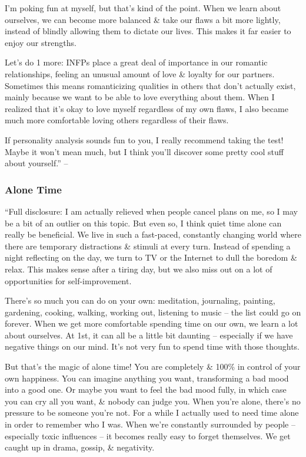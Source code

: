 \documentclass{article}
\numberwithin{equation}{section}
\begin{document}
I'm poking fun at myself, but that's kind of the point. When we learn about ourselves, we can become more balanced \& take our flaws a bit more lightly, instead of blindly allowing them to dictate our lives. This makes it far easier to enjoy our strengths.

Let's do 1 more: INFPs place a great deal of importance in our romantic relationships, feeling an unusual amount of love \& loyalty for our partners. Sometimes this means romanticizing qualities in others that don't actually exist, mainly because we want to be able to love everything about them. When I realized that it's okay to love myself regardless of my own flaws, I also became much more comfortable loving others regardless of their flaws.

If personality analysis sounds fun to you, I really recommend taking the test! Maybe it won't mean much, but I think you'll discover some pretty cool stuff about yourself.'' -- \cite[pp. 154--156]{MacKenzie2015}

\subsubsection{Alone Time}
``Full disclosure: I am actually relieved when people cancel plans on me, so I may be a bit of an outlier on this topic. But even so, I think quiet time alone can really be beneficial. We live in such a fast-paced, constantly changing world where there are temporary distractions \& stimuli at every turn. Instead of spending a night reflecting on the day, we turn to TV or the Internet to dull the boredom \& relax. This makes sense after a tiring day, but we also miss out on a lot of opportunities for self-improvement.

There's so much you can do on your own: meditation, journaling, painting, gardening, cooking, walking, working out, listening to music -- the list could go on forever. When we get more comfortable spending time on our own, we learn a lot about ourselves. At 1st, it can all be a little bit daunting -- especially if we have negative things on our mind. It's not very fun to spend time with those thoughts.

But that's the magic of alone time! You are completely \& 100\% in control of your own happiness. You can imagine anything you want, transforming a bad mood into a good one. Or maybe you want to feel the bad mood fully, in which case you can cry all you want, \& nobody can judge you. When you're alone, there's no pressure to be someone you're not. For a while I actually used to need time alone in order to remember who I was. When we're constantly surrounded by people -- especially toxic influences -- it becomes really easy to forget themselves. We get caught up in drama, gossip, \& negativity.
\end{document}
